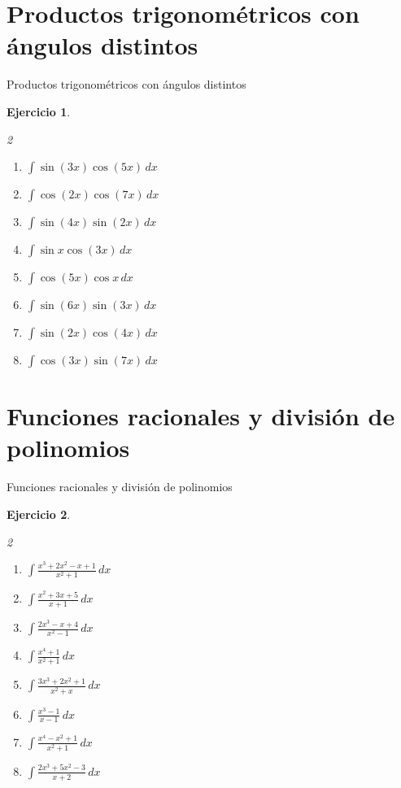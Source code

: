 \documentclass[10pt,aspectratio=169]{beamer}
\newtheorem{Ejer}{Ejercicio}
\begin{document}
\section{Productos trigonométricos con ángulos distintos}
\begin{frame}{Productos trigonométricos con ángulos distintos}
\begin{Ejer}
\begin{multicols}{2}
\begin{enumerate}
\item $\displaystyle \int \sin(3x)\cos(5x)\,dx$
\item $\displaystyle \int \cos(2x)\cos(7x)\,dx$
\item $\displaystyle \int \sin(4x)\sin(2x)\,dx$
\item $\displaystyle \int \sin x\cos(3x)\,dx$
\item $\displaystyle \int \cos(5x)\cos x\,dx$
\item $\displaystyle \int \sin(6x)\sin(3x)\,dx$
\item $\displaystyle \int \sin(2x)\cos(4x)\,dx$
\item $\displaystyle \int \cos(3x)\sin(7x)\,dx$
\end{enumerate}
\end{multicols}
\end{Ejer}
\end{frame}

\section{Funciones racionales y división de polinomios}
\begin{frame}{Funciones racionales y división de polinomios}
\begin{Ejer}
\begin{multicols}{2}
\begin{enumerate}
\item $\displaystyle \int \frac{x^3+2x^2-x+1}{x^2+1}\,dx$
\item $\displaystyle \int \frac{x^2+3x+5}{x+1}\,dx$
\item $\displaystyle \int \frac{2x^3-x+4}{x^2-1}\,dx$
\item $\displaystyle \int \frac{x^4+1}{x^2+1}\,dx$
\item $\displaystyle \int \frac{3x^3+2x^2+1}{x^2+x}\,dx$
\item $\displaystyle \int \frac{x^3-1}{x-1}\,dx$
\item $\displaystyle \int \frac{x^4-x^2+1}{x^2+1}\,dx$
\item $\displaystyle \int \frac{2x^3+5x^2-3}{x+2}\,dx$
\end{enumerate}
\end{multicols}
\end{Ejer}
\end{frame}
\end{document}
